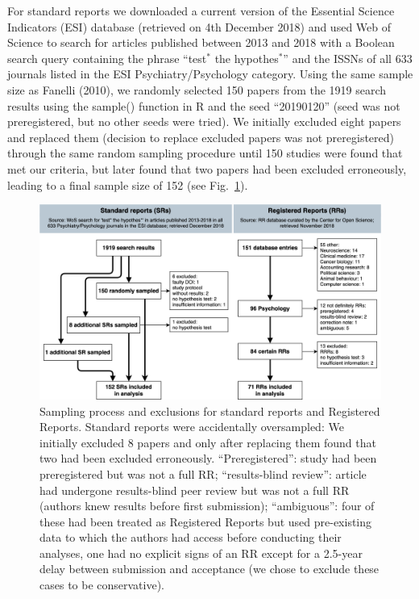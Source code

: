 \documentclass[british,,jou,floatsintext]{apa6}
\begin{document}
For standard reports we downloaded a current version of the Essential Science Indicators (ESI) database (retrieved on 4th December 2018) and used Web of Science to search for articles published between 2013 and 2018 with a Boolean search query containing the phrase \enquote{test\(^\ast\) the hypothes\(^\ast\)} and the ISSNs of all 633 journals listed in the ESI Psychiatry/Psychology category.
Using the same sample size as Fanelli (2010), we randomly selected 150 papers from the 1919 search results using the sample() function in R and the seed \enquote{20190120} (seed was not preregistered, but no other seeds were tried).
We initially excluded eight papers and replaced them (decision to replace excluded papers was not preregistered) through the same random sampling procedure until 150 studies were found that met our criteria, but later found that two papers had been excluded erroneously, leading to a final sample size of 152 (see Fig.~\ref{fig:sampling}).



\begin{figure}
\includegraphics[width=\textwidth]{sampling_process_flowchart} \caption{Sampling process and exclusions for standard reports and Registered Reports. Standard reports were accidentally oversampled: We initially excluded 8 papers and only after replacing them found that two had been excluded erroneously. \enquote{Preregistered}: study had been preregistered but was not a full RR; \enquote{results-blind review}: article had undergone results-blind peer review but was not a full RR (authors knew results before first submission); \enquote{ambiguous}: four of these had been treated as Registered Reports but used pre-existing data to which the authors had access before conducting their analyses, one had no explicit signs of an RR except for a 2.5-year delay between submission and acceptance (we chose to exclude these cases to be conservative).}\label{fig:sampling}
\end{figure}
\end{document}
